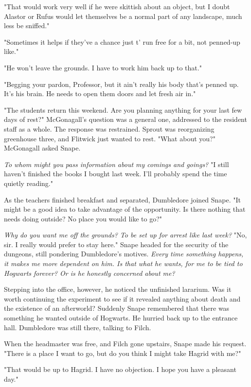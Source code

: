 "That would work very well if he were skittish about an object, but I doubt Alastor or Rufus would let themselves be a normal part of any landscape, much less be sniffed."

"Sometimes it helps if they've a chance just t' run free for a bit, not penned-up like."

"He won't leave the grounds. I have to work him back up to that."

"Begging your pardon, Professor, but it ain't really his body that's penned up. It's his brain. He needs to open them doors and let fresh air in."

"The students return this weekend. Are you planning anything for your last few days of rest?" McGonagall's question was a general one, addressed to the resident staff as a whole. The response was restrained. Sprout was reorganizing greenhouse three, and Flitwick just wanted to rest. "What about you?" McGonagall asked Snape.

\emph{To whom might you pass information about my comings and goings?} "I still haven't finished the books I bought last week. I'll probably spend the time quietly reading."

As the teachers finished breakfast and separated, Dumbledore joined Snape. "It might be a good idea to take advantage of the opportunity. Is there nothing that needs doing outside? No place you would like to go?"

\emph{Why do you want me off the grounds? To be set up for arrest like last week?} "No, sir. I really would prefer to stay here." Snape headed for the security of the dungeons, still pondering Dumbledore's motives. \emph{Every time something happens, it makes me more dependent on him. Is that what he wants, for me to be tied to Hogwarts forever? Or is he honestly concerned about me?}

Stepping into the office, however, he noticed the unfinished lararium. Was it worth continuing the experiment to see if it revealed anything about death and the existence of an afterworld? Suddenly Snape remembered that there was something he wanted outside of Hogwarts. He hurried back up to the entrance hall. Dumbledore was still there, talking to Filch.

When the headmaster was free, and Filch gone upstairs, Snape made his request. "There is a place I want to go, but{\el} do you think I might take Hagrid with me?"

"That would be up to Hagrid. I have no objection. I hope you have a pleasant day."

